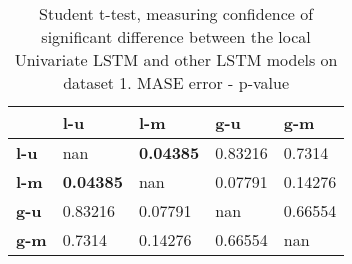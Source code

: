 \begin{table}[h]
\centering
\caption{Student t-test, measuring confidence of significant difference between the local Univariate LSTM and other LSTM models on dataset 1. MASE error - p-value}
\label{table:ttest-p-values-lstm-experiments-MASE-dataset-1}
\begin{tabular}{lllll}
\toprule
{} &               l-u &               l-m &      g-u &      g-m \\
\midrule
\textbf{l-u} &               nan &  \textbf{0.04385} &  0.83216 &   0.7314 \\
\textbf{l-m} &  \textbf{0.04385} &               nan &  0.07791 &  0.14276 \\
\textbf{g-u} &           0.83216 &           0.07791 &      nan &  0.66554 \\
\textbf{g-m} &            0.7314 &           0.14276 &  0.66554 &      nan \\
\bottomrule
\end{tabular}
\end{table}
